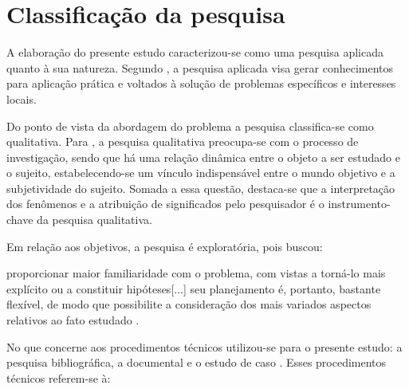 \section{Classificação da pesquisa}
\label{natureza}

A elaboração do presente estudo caracterizou-se como uma pesquisa aplicada quanto à sua natureza. Segundo , a pesquisa aplicada visa gerar conhecimentos para aplicação prática e voltados à solução de problemas específicos e interesses locais.

Do ponto de vista da abordagem do problema a pesquisa classifica-se como qualitativa. Para , a pesquisa qualitativa preocupa-se com o processo de investigação, sendo que há uma relação dinâmica entre o objeto a ser estudado e o sujeito, estabelecendo-se um vínculo indispensável entre o mundo objetivo e a subjetividade do sujeito. Somada a essa questão, destaca-se que a interpretação dos fenômenos e a atribuição de significados pelo pesquisador é o instrumento-chave da pesquisa qualitativa.

Em relação aos objetivos, a pesquisa é exploratória, pois buscou:

\begin{citacao}
proporcionar maior familiaridade com o problema, com vistas a torná-lo mais explícito ou a constituir hipóteses[...] seu planejamento é, portanto, bastante flexível, de modo que possibilite a consideração dos mais variados aspectos relativos ao fato estudado \cite[p.41]{gil2002elaborar}.
\end{citacao}

No que concerne aos procedimentos técnicos utilizou-se para o presente estudo: a pesquisa bibliográfica, a documental e o estudo de caso \cite{gil2002elaborar}. Esses procedimentos técnicos referem-se à:

